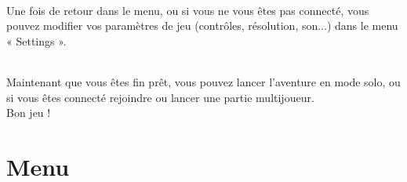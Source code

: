 \documentclass[titlepage, 13px, a4paper]{report}
\begin{document}
\paragraph*{} \hspace{0pt}
Une fois de retour dans le menu, ou si vous ne vous êtes pas connecté, vous pouvez modifier vos paramètres 
de jeu (contrôles, résolution, son...) dans le menu « Settings ». \\


\paragraph*{} \hspace{0pt}
Maintenant que vous êtes fin prêt, vous pouvez lancer l'aventure en mode solo, ou si vous êtes connecté rejoindre 
ou lancer une partie multijoueur. \\ Bon jeu ! \\



\newpage


\part{Menu} 
\end{document}
